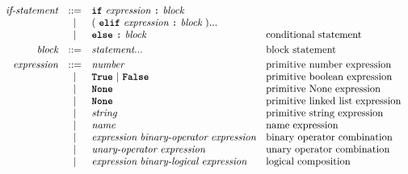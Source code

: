 \[\begin{array}{rcll}
\textit{if-statement}    & ::= & \term{if}\ \textit{expression}\ \term{:}\ \textit{block}                                &                                         \\
                         & |   & (\ \term{elif}\ \textit{expression}\ \term{:}\ \textit{block}\ )...                     &                                         \\
                         & |   & \term{else}\ \term{:}\ \textit{block}                                                   & \text{conditional statement}            \\[1mm]
\textit{block}           & ::= & \textit{statement}...                                                                   & \text{block statement}                  \\[1mm]
\textit{expression}      & ::= & \textit{number}                                                                         & \text{primitive number expression}      \\
                         & |   & \term{True}\ |\ \term{False}                                                            & \text{primitive boolean expression}     \\
                         & |   & \term{None}                                                                             & \text{primitive None expression}        \\
                         & |   & \term{None}                                                                             & \text{primitive linked list expression} \\
                         & |   & \textit{string}                                                                         & \text{primitive string expression}      \\
                         & |   & \textit{name}                                                                           & \text{name expression}                  \\
                         & |   & \textit{expression}\ \textit{binary-operator}\ \textit{expression}                      & \text{binary operator combination}      \\
                         & |   & \textit{unary-operator}\ \textit{expression}                                            & \text{unary operator combination}       \\
                         & |   & \textit{expression}\ \textit{binary-logical}\ \textit{expression}                       & \text{logical composition}              \\

\end{array}\]
